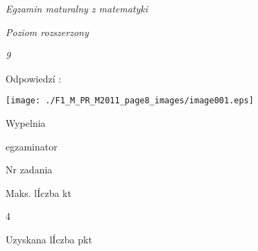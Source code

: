 \documentclass[a4paper,12pt]{article}
\begin{document}
{\it Egzamin maturalny z matematyki}

{\it Poziom rozszerzony}

{\it 9}

Odpowiedzí :
\begin{center}
\texttt{[image: ./F1\_M\_PR\_M2011\_page8\_images/image001.eps]}
\end{center}
Wypelnia

egzaminator

Nr zadania

Maks. lÍczba kt

4

Uzyskana lÍczba pkt
\end{document}
